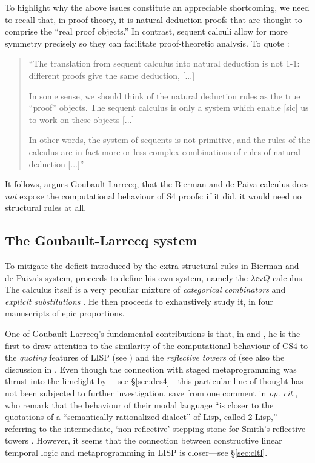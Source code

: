 \documentclass[a4paper]{amsart}
\begin{document}
To highlight why the above issues constitute an appreciable
shortcoming, we need to recall that, in proof theory, it is
natural deduction proofs that are thought to comprise the ``real
proof objects.'' In contrast, sequent calculi allow for more
symmetry precisely so they can facilitate proof-theoretic
analysis. To quote \cite[\S 5.4]{Girard1989}: \begin{quote}
  ``The translation from sequent calculus into natural deduction is
  not 1-1: different proofs give the same deduction, [...]

  In some sense, we should think of the natural deduction rules as
  the true ``proof'' objects. The sequent calculus is only a
  system which enable [sic] us to work on these objects [...]

  In other words, the system of sequents is not primitive, and the
  rules of the calculus are in fact more or less complex
  combinations of rules of natural deduction [...]''
\end{quote} It follows, argues Goubault-Larrecq, that the Bierman
and de Paiva calculus does \emph{not} expose the computational
behaviour of S4 proofs: if it did, it would need no structural
rules at all.

\subsection{The Goubault-Larrecq system}

To mitigate the deficit introduced by the extra structural rules
in Bierman and de Paiva's system,
\cite{Goubault-Larrecq1996, Goubault-Larrecq1996a,
Goubault-Larrecq1996b, Goubault-Larrecq1997} proceeds to define
his own system, namely the $\lambda\textsf{ev}Q$ calculus.
The calculus itself is a very peculiar mixture of
\emph{categorical combinators} \citep{Curien1993} and
\emph{explicit substitutions} \citep{Abadi1991}. He then proceeds
to exhaustively study it, in four manuscripts of epic proportions.

One of Goubault-Larrecq's fundamental contributions is that, in
\cite[\S 2]{Goubault-Larrecq1996} and \cite[\S
2.3]{Goubault-Larrecq1996a}, he is the first to draw attention to
the similarity of the computational behaviour of \textsf{CS4} to
the \emph{quoting} features of LISP (see \cite{Bawden1999}) and
the \emph{reflective towers} of \cite{Smith1984} (see also the
discussion in \cite{Goubault-Larrecq1997a}. Even though the
connection with staged metaprogramming was thrust into the
limelight by \cite{Davies2001a}---see \S \ref{sec:dcs4}---this
particular line of thought has not been subjected to further
investigation, save from one comment in \emph{op. cit.}, who
remark that the behaviour of their modal language ``is closer to
the quotations of a ``semantically rationalized dialect'' of Lisp,
called 2-Lisp,'' referring to the intermediate, `non-reflective'
stepping stone for Smith's reflective towers \citep{Smith1984}.
However, it seems that the connection between constructive linear
temporal logic and metaprogramming in LISP is closer---see
\S \ref{sec:cltl}.
\end{document}
